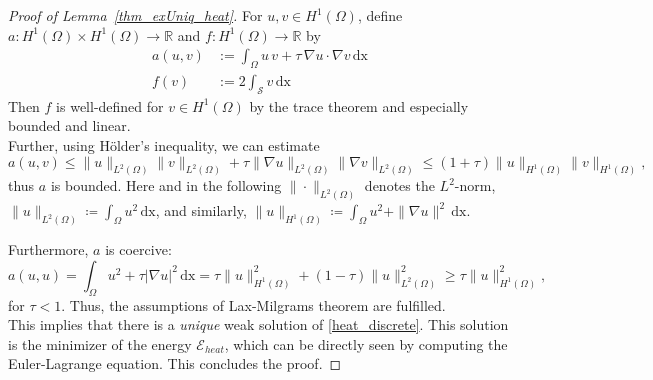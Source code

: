 \documentclass[12pt,openany]{book}
\newcommand{\R}{\mathbb{R}}
\def\S{\mathcal{S}}
\theoremstyle{plainnormal}
\theoremstyle{remark}
\begin{document}
\begin{proof}[Proof of Lemma~\ref{thm_exUniq_heat}]
    For $u,v \in H^1(\Omega)$, define $a: H^1(\Omega)\times H^1(\Omega) \rightarrow \R$ and $f: H^1(\Omega) \rightarrow\R$ by 
    \begin{align*}
        a(u,v) &:= \int_\Omega u\,v + \tau \,\nabla u\cdot\nabla v \,\mathrm{dx}\\
        f(v) & := 2\int_\S v \,\mathrm{dx} 
    \end{align*}
    Then $f$ is well-defined for $v \in H^1(\Omega)$ by the trace theorem and especially bounded and linear.\\
    Further, using Hölder's inequality, we can estimate  $$a(u,v) \leq \|u\|_{L^2(\Omega)}\|v\|_{L^2(\Omega)} + \tau \|\nabla u\|_{L^2(\Omega)}\|\nabla v\|_{L^2(\Omega)} \leq (1 + \tau) \|u\|_{H^1(\Omega)}\|v\|_{H^1(\Omega)},$$ thus $a$ is bounded. Here and in the following $\|\cdot\|_{L^2(\Omega)}$ denotes the $L^2$-norm, $\|u\|_{L^2(\Omega)} \coloneqq \int_\Omega u^2\, \mathrm{dx}$, and similarly, $\|u\|_{H^1(\Omega)} \coloneqq \int_\Omega u^2 + \|\nabla u\|^2\, \mathrm{dx}$. \par
    Furthermore, $a$ is coercive:  $$a(u,u) = \int_\Omega u^2 + \tau |\nabla u|^2 \,\mathrm{dx} = \tau \|u\|^2_{H^1(\Omega)} + (1-\tau) \|u\|^2_{L^2(\Omega)} \geq \tau \|u\|^2_{H^1(\Omega)},$$ for $\tau < 1$. Thus, the assumptions of Lax-Milgrams theorem are fulfilled. \\
    This implies that there is a \emph{unique} weak solution of \cref{heat_discrete}. This solution is the minimizer of the energy $\mathcal{E}_{heat}$, which can be directly seen by computing the Euler-Lagrange equation. This concludes the proof.
\end{proof}
\end{document}

